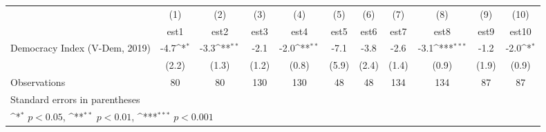 {
\def\sym#1{\ifmmode^{#1}\else\(^{#1}\)\fi}
\begin{tabular}{l*{10}{c}}
\hline\hline
                    &\multicolumn{1}{c}{(1)}         &\multicolumn{1}{c}{(2)}         &\multicolumn{1}{c}{(3)}         &\multicolumn{1}{c}{(4)}         &\multicolumn{1}{c}{(5)}         &\multicolumn{1}{c}{(6)}         &\multicolumn{1}{c}{(7)}         &\multicolumn{1}{c}{(8)}         &\multicolumn{1}{c}{(9)}         &\multicolumn{1}{c}{(10)}         \\
                    &        est1         &        est2         &        est3         &        est4         &        est5         &        est6         &        est7         &        est8         &        est9         &       est10         \\
\hline
Democracy Index (V-Dem, 2019)&        -4.7\sym{*}  &        -3.3\sym{**} &        -2.1         &        -2.0\sym{**} &        -7.1         &        -3.8         &        -2.6         &        -3.1\sym{***}&        -1.2         &        -2.0\sym{*}  \\
                    &       (2.2)         &       (1.3)         &       (1.2)         &       (0.8)         &       (5.9)         &       (2.4)         &       (1.4)         &       (0.9)         &       (1.9)         &       (0.9)         \\
\hline
Observations        &          80         &          80         &         130         &         130         &          48         &          48         &         134         &         134         &          87         &          87         \\
\hline\hline
\multicolumn{11}{l}{\footnotesize Standard errors in parentheses}\\
\multicolumn{11}{l}{\footnotesize \sym{*} \(p<0.05\), \sym{**} \(p<0.01\), \sym{***} \(p<0.001\)}\\
\end{tabular}
}
